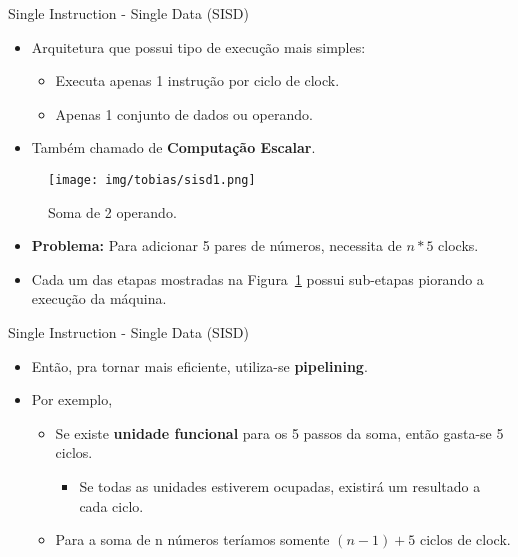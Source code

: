 \begin{frame}{Single Instruction - Single Data (SISD)}
	\begin{itemize}
		\item Arquitetura que possui tipo de execução mais simples:
		\begin{itemize}
    		\item Executa apenas 1 instrução por ciclo de clock.
    		\item Apenas 1 conjunto de dados ou operando.
		\end{itemize}

		\item Também chamado de \textbf{Computação Escalar}. 
	\end{itemize}

	\begin{figure}[h]
		\centering
		\texttt{[image: img/tobias/sisd1.png]}
		\caption{Soma de 2 operando.}
		\label{fig:sisd1}
	\end{figure}

	\begin{itemize}
		\item \textbf{Problema:} Para adicionar 5 pares de números, necessita de $n * 5$ clocks.
		\item Cada um das etapas mostradas na Figura~\ref{fig:sisd1} possui sub-etapas piorando a execução da máquina.
	\end{itemize}

\end{frame}


\begin{frame}{Single Instruction - Single Data (SISD)}
    \begin{itemize}
		\item Então, pra tornar mais eficiente, utiliza-se \textbf{pipelining}.
		\item Por exemplo,
		\begin{itemize}
			\item  Se existe \textbf{unidade funcional} para os 5 passos da soma, então gasta-se 5 ciclos.
			\begin{itemize}
    		    \item Se todas as unidades estiverem ocupadas, existirá um resultado a cada ciclo. 
			\end{itemize}

    		\item Para a soma de n números teríamos somente $(n - 1) + 5$ ciclos de clock.
		\end{itemize}

	\end{itemize}

\end{frame}


